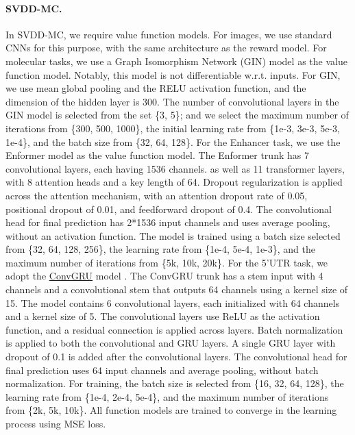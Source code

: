 \paragraph{SVDD-MC.} In SVDD-MC, we require value function models. For images, we use standard CNNs for this purpose, with the same architecture as the reward model. For molecular tasks, we use a Graph Isomorphism Network (GIN) model \citep{xu2018powerful} as the value function model. Notably, this model is not differentiable w.r.t. inputs. For GIN, we use mean global pooling and the RELU activation function, and the dimension of the hidden layer is 300. The number of convolutional layers in the GIN model is selected from the set \{3, 5\}; and we select the maximum number of iterations from \{300, 500, 1000\}, the initial learning rate from \{1e-3, 3e-3, 5e-3, 1e-4\}, and the batch size from \{32, 64, 128\}.
For the Enhancer task, we use the Enformer model \citep{avsec2021effective} as the value function model. The Enformer trunk has 7 convolutional layers, each having 1536 channels. as well as 11 transformer layers, with 8 attention heads and a key length of 64. Dropout regularization is applied across the attention mechanism, with an attention dropout rate of 0.05, positional dropout of 0.01, and feedforward dropout of 0.4. The convolutional head for final prediction has 2*1536 input channels and uses average pooling, without an activation function. The model is trained using a batch size selected from \{32, 64, 128, 256\}, the learning rate from \{1e-4, 5e-4, 1e-3\}, and the maximum number of iterations from \{5k, 10k, 20k\}.
For the 5'UTR task, we adopt the \href{https://github.com/jacobkimmel/pytorch_convgru?tab=readme-ov-filea}{ConvGRU} model \citep{dey2017gate}. The ConvGRU trunk has a stem input with 4 channels and a convolutional stem that outputs 64 channels using a kernel size of 15. The model contains 6 convolutional layers, each initialized with 64 channels and a kernel size of 5. The convolutional layers use ReLU as the activation function, and a residual connection is applied across layers. Batch normalization is applied to both the convolutional and GRU layers. A single GRU layer with dropout of 0.1 is added after the convolutional layers. The convolutional head for final prediction uses 64 input channels and average pooling, without batch normalization. For training, the batch size is selected from \{16, 32, 64, 128\}, the learning rate from \{1e-4, 2e-4, 5e-4\}, and the maximum number of iterations from \{2k, 5k, 10k\}.
All function models are trained to converge in the learning process using MSE loss.

